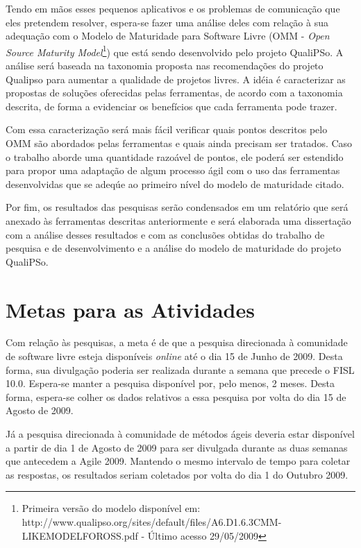 Tendo em mãos esses pequenos aplicativos e os problemas de comunicação
que eles pretendem resolver, espera-se fazer uma análise deles com
relação à sua adequação com o Modelo de Maturidade para Software Livre
(OMM - \emph{Open Source Maturity Model}\footnote{Primeira versão do
  modelo disponível em:
  http://www.qualipso.org/sites/default/files/A6.D1.6.3CMM-LIKEMODELFOROSS.pdf
  - Último acesso 29/05/2009}) que está sendo desenvolvido pelo
projeto QualiPSo. A análise será baseada na taxonomia proposta nas
recomendações do projeto Qualipso \cite{Malheiros2009} para aumentar a
qualidade de projetos livres. A idéia é caracterizar as propostas de
soluções oferecidas pelas ferramentas, de acordo com a taxonomia
descrita, de forma a evidenciar os benefícios que cada ferramenta pode
trazer.

Com essa caracterização será mais fácil verificar quais pontos
descritos pelo OMM são abordados pelas ferramentas e quais ainda
precisam ser tratados. Caso o trabalho aborde uma quantidade razoável
de pontos, ele poderá ser estendido para propor uma adaptação de algum
processo ágil com o uso das ferramentas desenvolvidas que se adeqúe ao
primeiro nível do modelo de maturidade citado.

Por fim, os resultados das pesquisas serão condensados em um relatório
que será anexado às ferramentas descritas anteriormente e será
elaborada uma dissertação com a análise desses resultados e com as
conclusões obtidas do trabalho de pesquisa e de desenvolvimento e a
análise do modelo de maturidade do projeto QualiPSo.

\section{Metas para as Atividades}
\label{sec:cronograma}

Com relação às pesquisas, a meta é de que a pesquisa direcionada à
comunidade de software livre esteja disponíveis \emph{online} até o
dia 15 de Junho de 2009. Desta forma, sua divulgação poderia ser
realizada durante a semana que precede o FISL 10.0. Espera-se manter a
pesquisa disponível por, pelo menos, 2 meses. Desta forma, espera-se
colher os dados relativos a essa pesquisa por volta do dia 15 de
Agosto de 2009.

Já a pesquisa direcionada à comunidade de métodos ágeis deveria estar
disponível a partir de dia 1 de Agosto de 2009 para ser divulgada
durante as duas semanas que antecedem a Agile 2009. Mantendo o mesmo
intervalo de tempo para coletar as respostas, os resultados seriam
coletados por volta do dia 1 do Outubro 2009.

